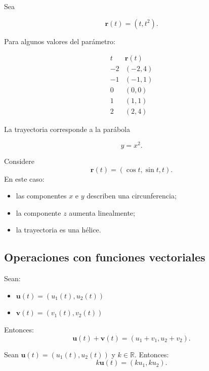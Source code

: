 \begin{ejemplo}[Parábola]

Sea

\[
\mathbf{r}(t)=\left(t,t^{2}\right).
\]

Para algunos valores del parámetro:

\[
\begin{array}{c|c}
t & \mathbf{r}(t)\\
\hline
-2&(-2,4)\\
-1&(-1,1)\\
0&(0,0)\\
1&(1,1)\\
2&(2,4)
\end{array}
\]

La trayectoria corresponde a la parábola

\[
y=x^{2}.
\]
\end{ejemplo}

\begin{ejemplo}[Hélice]
Considere
\[
\mathbf{r}(t)=\left(\cos t,\sin t,t\right).
\]
En este caso:
\begin{itemize}
    \item las componentes $x$ e $y$ describen una circunferencia;
    \item la componente $z$ aumenta linealmente;
    \item la trayectoria es una hélice.
\end{itemize}
\end{ejemplo}

\newpage

\subsection{Operaciones con funciones vectoriales}

\begin{definicion}[Suma]
Sean:
\begin{itemize}
    \item $\mathbf{u}(t)=\left(u_{1}(t),u_{2}(t)\right)$
    \item $\mathbf{v}(t)=\left(v_{1}(t),v_{2}(t)\right)$
\end{itemize} 
Entonces:
\[
\mathbf{u}(t)+\mathbf{v}(t)
=
\left(
u_{1}+v_{1},
u_{2}+v_{2}
\right).
\]
\end{definicion}

\begin{definicion}
Sean $\mathbf{u}(t)=\left(u_{1}(t),u_{2}(t)\right)$ y $k \in \mathbb{R}$. Entonces:
\[
k\mathbf{u}(t)
=
\left(
ku_{1},
ku_{2}
\right).
\]
\end{definicion}


